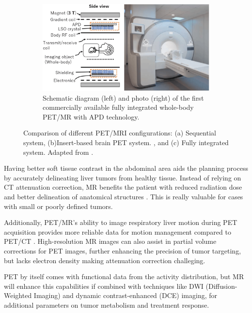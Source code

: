 \begin{multicols}{2}
\begin{figure}[H]
	\begin{subfigure}[b]{0.45\textwidth}
		\centering
		\includegraphics[width=\textwidth]{assets/integrated.png}
		\caption{Schematic diagram (left) and photo (right) of the first commercially available fully integrated whole-body PET/MR with APD technology.}
		\label{fig:integrated}
	\end{subfigure}
	
	\caption{Comparison of different PET/MRI configurations: (a) Sequential system, (b)Insert-based brain PET system. , and (c) Fully integrated system. Adapted from \cite{Kang2021}.}
	\label{fig:pet_mri_configurations}
\end{figure}


Having better soft tissue contrast in the abdominal area aids the planning process by accurately delineating liver tumors from healthy tissue. Instead of relying on CT attenuation correction, MR benefits the patient with reduced radiation dose and better delineation of anatomical structures \cite{knesaurek2018}. This is really valuable for cases with small or poorly defined tumors.

Additionally, PET/MR’s ability to image respiratory liver motion during PET acquisition provides more reliable data for motion management compared to PET/CT \cite{knesaurek2018}. High-resolution MR images can also assist in partial volume corrections for PET images, further enhancing the precision of tumor targeting, but lacks electron density making attenuation correction challeging.

PET by itself comes with functional data from the activity distribution, but MR will enhance this capabilities if combined with techniques like DWI (Diffusion-Weighted Imaging) and dynamic contrast-enhanced (DCE) imaging, for additional parameters on tumor metabolism and treatment response. 


\end{multicols}
